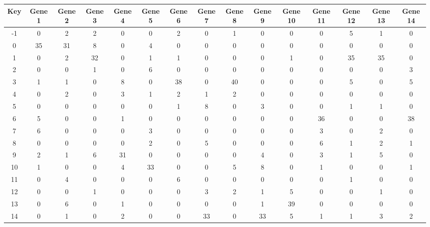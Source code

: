 \begin{tabular}{|c|c|c|c|c|c|c|c|c|c|c|c|c|c|c|}
\hline
Key & Gene 1 & Gene 2 & Gene 3 & Gene 4 & Gene 5 & Gene 6 & Gene 7 & Gene 8 & Gene 9 & Gene 10 & Gene 11 & Gene 12 & Gene 13 & Gene 14 \\
\hline
-1 & 0 & 2 & 2 & 0 & 0 & 2 & 0 & 1 & 0 & 0 & 0 & 5 & 1 & 0 \\
0 & 35 & 31 & 8 & 0 & 4 & 0 & 0 & 0 & 0 & 0 & 0 & 0 & 0 & 0 \\
1 & 0 & 2 & 32 & 0 & 1 & 1 & 0 & 0 & 0 & 1 & 0 & 35 & 35 & 0 \\
2 & 0 & 0 & 1 & 0 & 6 & 0 & 0 & 0 & 0 & 0 & 0 & 0 & 0 & 3 \\
3 & 1 & 1 & 0 & 8 & 0 & 38 & 0 & 40 & 0 & 0 & 0 & 5 & 0 & 5 \\
4 & 0 & 2 & 0 & 3 & 1 & 2 & 1 & 2 & 0 & 0 & 0 & 0 & 0 & 0 \\
5 & 0 & 0 & 0 & 0 & 0 & 1 & 8 & 0 & 3 & 0 & 0 & 1 & 1 & 0 \\
6 & 5 & 0 & 0 & 1 & 0 & 0 & 0 & 0 & 0 & 0 & 36 & 0 & 0 & 38 \\
7 & 6 & 0 & 0 & 0 & 3 & 0 & 0 & 0 & 0 & 0 & 3 & 0 & 2 & 0 \\
8 & 0 & 0 & 0 & 0 & 2 & 0 & 5 & 0 & 0 & 0 & 6 & 1 & 2 & 1 \\
9 & 2 & 1 & 6 & 31 & 0 & 0 & 0 & 0 & 4 & 0 & 3 & 1 & 5 & 0 \\
10 & 1 & 0 & 0 & 4 & 33 & 0 & 0 & 5 & 8 & 0 & 1 & 0 & 0 & 1 \\
11 & 0 & 4 & 0 & 0 & 0 & 6 & 0 & 0 & 0 & 0 & 0 & 1 & 0 & 0 \\
12 & 0 & 0 & 1 & 0 & 0 & 0 & 3 & 2 & 1 & 5 & 0 & 0 & 1 & 0 \\
13 & 0 & 6 & 0 & 1 & 0 & 0 & 0 & 0 & 1 & 39 & 0 & 0 & 0 & 0 \\
14 & 0 & 1 & 0 & 2 & 0 & 0 & 33 & 0 & 33 & 5 & 1 & 1 & 3 & 2 \\
\hline
\end{tabular}